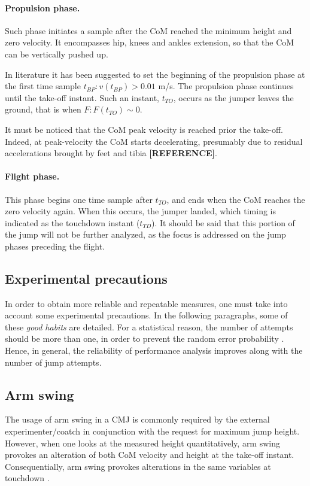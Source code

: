 \paragraph{Propulsion phase.}  Such phase initiates a sample after the CoM reached the minimum height and zero velocity. It encompasses hip, knees and ankles extension, so that the CoM can be vertically pushed up. 

In literature \citep{mcmahon_threshold_2018} it has been suggested to set the beginning of the propulsion phase at the first time sample $t_{BP} : v(t_{BP}) > 0.01$ m/s. The propulsion phase continues until the take-off instant. Such an instant, $t_{TO}$, occurs as the jumper leaves the ground, that is when $F : F(t_{TO}) \sim 0$.

It must be noticed that the CoM peak velocity is reached prior the take-off. Indeed, at peak-velocity the CoM starts decelerating, presumably due to residual accelerations brought by feet and tibia \textbf{[REFERENCE]}.

\paragraph{Flight phase.} This phase begins one time sample after $t_{TO}$, and ends when the CoM reaches the zero velocity again. When this occurs, the jumper landed, which timing is indicated as the touchdown instant ($t_{TD}$).
It should be said that this portion of the jump will not be further analyzed, as the focus is addressed on the jump phases preceding the flight. 


\subsection{Experimental precautions}
In order to obtain more reliable and repeatable measures, one must take into account some experimental precautions. In the following paragraphs, some of these \textit{good habits} are detailed. For a statistical reason, the number of attempts should be more than one, in order to prevent the random error probability \citep{henry_best_1967}. Hence, in general, the reliability of performance analysis improves along with the number of jump attempts. 

\subsection{Arm swing}
The usage of arm swing in a CMJ is commonly required by the external experimenter/coatch in conjunction with the request for maximum jump height. However, when one looks at the measured height quantitatively, arm swing provokes an alteration of both CoM velocity and height at the take-off instant. Consequentially, arm swing provokes alterations in the same variables at touchdown \citep{gutierrez-davila_analysis_2014}. 

